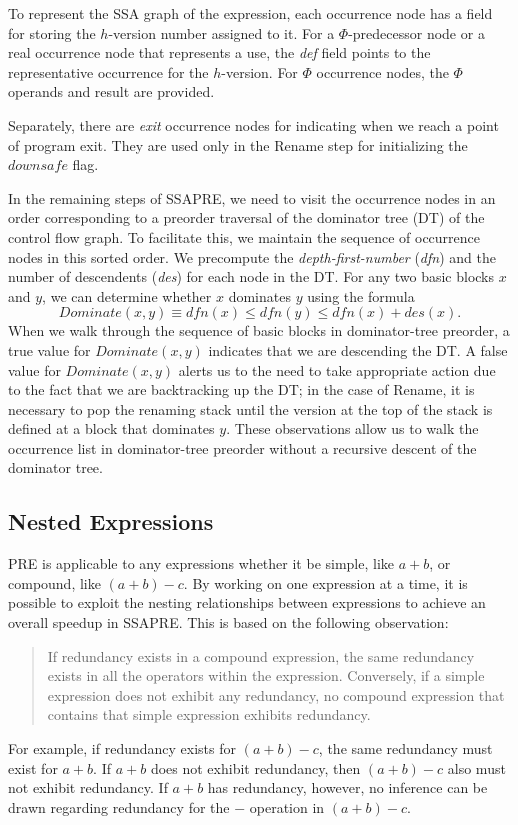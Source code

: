 To represent the SSA graph of the expression, each occurrence node has a field
for storing the $h$-version number assigned to it.  For a $\Phi$-predecessor
node or a real occurrence node that represents a use, the \emph{def} field
points to the representative occurrence for the $h$-version.  For $\Phi$
occurrence nodes, the $\Phi$ operands and result are provided.

Separately, there are \emph{exit} occurrence nodes for indicating when we
reach a point of program exit.  They are used only in the Rename step for
initializing the $downsafe$ flag.

In the remaining steps of SSAPRE, we need to visit the occurrence nodes in an
order corresponding to a preorder traversal of the dominator tree (DT) of the
control flow graph.  To facilitate this, we maintain the sequence of
occurrence nodes in this sorted order.  We precompute the 
\emph{depth-first-number} (\emph{dfn}) and the number of descendents
(\emph{des}) for each node in the DT.  For any two basic blocks $x$ and $y$,
we can determine whether $x$ dominates $y$ using the formula
$$Dominate(x,y) \equiv dfn(x) \leq dfn(y) \leq dfn(x) + des(x).$$
When we walk through the sequence of basic blocks in dominator-tree preorder,
a true value for $Dominate(x,y)$ indicates that we are descending the DT.
A false value for
$Dominate(x,y)$ alerts us to the need to take appropriate action due
to the fact that we are backtracking up the DT; in the case of Rename, it is
necessary to pop the renaming stack until the version at the top of the stack
is defined at a block that dominates $y$.  These observations allow us to walk
the occurrence list in dominator-tree preorder without a recursive descent of
the dominator tree.

\subsection{Nested Expressions}

PRE is applicable to any expressions whether it be simple, like $a+b$, or
compound, like $(a+b)-c$.  By working on one expression at a time, it is 
possible to exploit the nesting relationships
between expressions to achieve an overall speedup in SSAPRE.  This is based
on the following observation:
\begin{quote}
If redundancy exists in a compound expression, the same redundancy exists in
all the operators within the expression.  Conversely, if a simple expression
does not exhibit any redundancy, no compound expression that contains that
simple expression exhibits redundancy.
\end{quote}
For example, if redundancy exists for $(a+b)-c$, the same redundancy must
exist for $a+b$.  If $a+b$ does not exhibit redundancy, then $(a+b)-c$ also
must not exhibit redundancy.  If $a+b$ has redundancy, however, no inference
can be drawn regarding redundancy for the $-$ operation in $(a+b)-c$.

